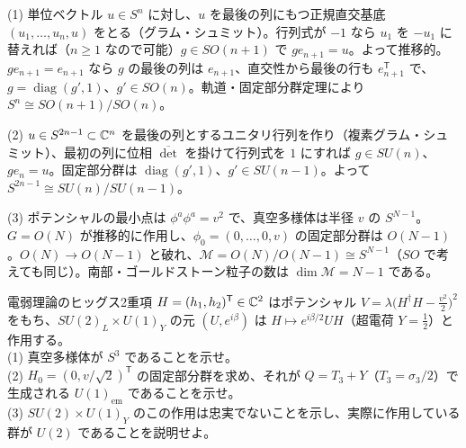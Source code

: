 \begin{solution}
(1) 単位ベクトル $u\in S^n$ に対し、$u$ を最後の列にもつ正規直交基底 $(u_1,\dots,u_n,u)$ をとる（グラム・シュミット）。行列式が $-1$ なら $u_1$ を $-u_1$ に替えれば（$n\ge1$ なので可能）$g\in SO(n+1)$ で $g e_{n+1}=u$。よって推移的。$ge_{n+1}=e_{n+1}$ なら $g$ の最後の列は $e_{n+1}$、直交性から最後の行も $e_{n+1}^{\mathsf T}$ で、$g=\operatorname{diag}(g',1)$、$g'\in SO(n)$。軌道・固定部分群定理により $S^n\cong SO(n+1)/SO(n)$。

(2) $u\in S^{2n-1}\subset\mathbb{C}^n$ を最後の列とするユニタリ行列を作り（複素グラム・シュミット）、最初の列に位相 $\overline{\det}$ を掛けて行列式を $1$ にすれば $g\in SU(n)$、$ge_n=u$。固定部分群は $\operatorname{diag}(g',1)$、$g'\in SU(n-1)$。よって $S^{2n-1}\cong SU(n)/SU(n-1)$。

(3) ポテンシャルの最小点は $\phi^a\phi^a=v^2$ で、真空多様体は半径 $v$ の $S^{N-1}$。$G=O(N)$ が推移的に作用し、$\phi_0=(0,\dots,0,v)$ の固定部分群は $O(N-1)$。$O(N)\to O(N-1)$ と破れ、$\mathcal M=O(N)/O(N-1)\cong S^{N-1}$（$SO$ で考えても同じ）。南部・ゴールドストーン粒子の数は $\dim\mathcal M=N-1$ である。
\end{solution}

\begin{problem}[難易度 B]\label{ch01-prob-ew}
電弱理論のヒッグス2重項 $H=(h_1,h_2)^{\mathsf T}\in\mathbb{C}^2$ はポテンシャル $V=\lambda\bigl(H^\dagger H-\tfrac{v^2}{2}\bigr)^2$ をもち、$SU(2)_L\times U(1)_Y$ の元 $(U,e^{i\beta})$ は $H\mapsto e^{i\beta/2}UH$（超電荷 $Y=\tfrac12$）と作用する。\\
(1) 真空多様体が $S^3$ であることを示せ。\\
(2) $H_0=(0,v/\sqrt2)^{\mathsf T}$ の固定部分群を求め、それが $Q=T_3+Y$（$T_3=\sigma_3/2$）で生成される $U(1)_{\mathrm{em}}$ であることを示せ。\\
(3) $SU(2)\times U(1)_Y$ のこの作用は忠実でないことを示し、実際に作用している群が $U(2)$ であることを説明せよ。
\end{problem}

